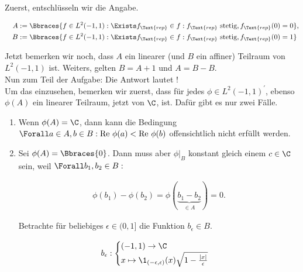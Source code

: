 \begin{solution}

Zuerst, entschlüsseln wir die Angabe.

\begin{align*}
  A & :=
  \Bbraces
  {
    f \in L^2(-1, 1):
    \Exists f_\Text{rep} \in f:
    f_\Text{rep} \text{ stetig},
    f_\Text{rep}(0) = 0
  }, \\
  \quad
  B & :=
  \Bbraces
  {
    f \in L^2(-1, 1):
    \Exists f_\Text{rep} \in f:
    f_\Text{rep} \text{ stetig},
    f_\Text{rep}(0) = 1
  }
\end{align*}

Jetzt bemerken wir noch, dass $A$ ein linearer (und $B$ ein affiner) Teilraum von $L^2(-1, 1)$ ist.
Weiters, gelten $B = A + 1$ und $A = B - B$. \\

Nun zum  Teil der Aufgabe:
Die Antwort lautet ! \\

Um das einzusehen, bemerken wir zuerst, dass für jedes $\phi \in L^2(-1, 1)^\prime$, ebenso $\phi(A)$ ein linearer Teilraum, jetzt von
$\C$, ist.
Dafür gibt es nur zwei Fälle.

\begin{enumerate}[label = Fall \arabic*:]

  \item
  Wenn $\phi(A) = \C$, dann kann die Bedingung $\Forall a \in A, b \in B: \text{Re } \phi(a) < \text{Re } \phi(b)$
  offensichtlich nicht erfüllt werden.

  \item
  Sei $\phi(A) = \Bbraces{0}$.
  Dann muss aber $\phi|_B$ konstant gleich einem $c \in \C$ sein, weil $\Forall b_1, b_2 \in B:$

  \begin{align*}
    \phi(b_1) - \phi(b_2)
    =
    \phi(\underbrace{b_1 - b_2}_{\in A})
    =
    0.
  \end{align*}

  Betrachte für beliebiges $\epsilon \in (0, 1]$ die Funktion $b_\epsilon \in B$.

  \begin{align*}
    b_\epsilon:
    \begin{cases}
      (-1, 1) \to \C \\
      x \mapsto
      \1_{(-\epsilon, \epsilon)}(x)
      \sqrt{1 - \frac{|x|}{\epsilon}}
    \end{cases}
  \end{align*}


\end{enumerate}
\end{solution}
